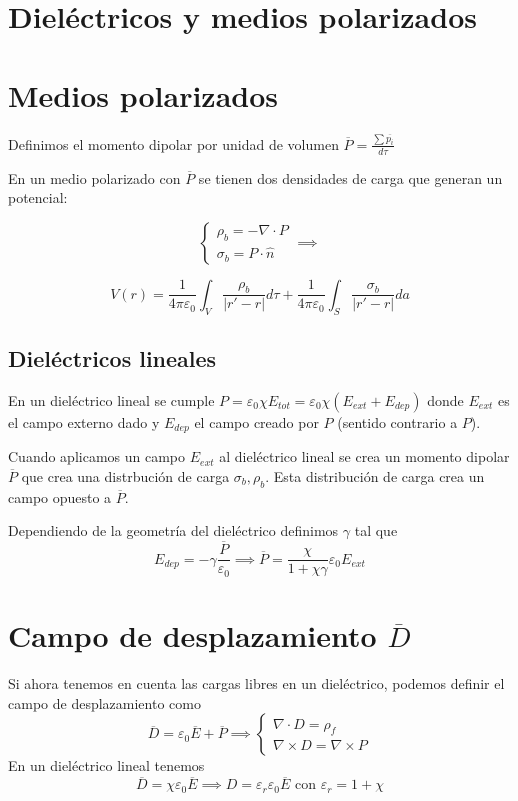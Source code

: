 \documentclass{myclass}
\begin{document}
\section{Dieléctricos y medios polarizados}
\section{Medios polarizados}
Definimos el momento dipolar por unidad de volumen $\boxed{\overline{P} = \frac{\sum \overline{p_i}}{d\tau}}$

En un medio polarizado con $\overline{P}$ se tienen dos densidades de carga que generan un potencial:

\begin{minipage}{0.4\textwidth}
\[
\begin{cases}
  \rho _b = -\nabla\cdot P\\
  \sigma _b = P\cdot \hat{n}
\end{cases}
\implies
\] 
\end{minipage}
\begin{minipage}{0.6\textwidth}
\[
V(r)=\frac{1}{4\pi\varepsilon _0}\int_V \frac{\rho _b}{ |r'-r|}d\tau + \frac{1}{4\pi\varepsilon _0}\int_S \frac{\sigma _b}{|r'-r|}da
\] 
\end{minipage}

\subsection{Dieléctricos lineales}
En un dieléctrico lineal se cumple $P = \varepsilon_0 \chi E_{tot} = \varepsilon _0\chi (E_{ext}+E_{dep})$ donde $E_{ext}$ es el campo externo dado y $E_{dep}$ el campo creado por $P$ (sentido contrario a $P$).

Cuando aplicamos un campo $E_{ext}$ al dieléctrico lineal se crea un momento dipolar $\overline{P}$ que crea una distrbución de carga $\sigma _b, \rho _b$. Esta distribución de carga crea un campo opuesto a $\overline{P}$.

Dependiendo de la geometría del dieléctrico definimos $\gamma$ tal que 
\[
E_{dep} = -\gamma \frac{\overline{P}}{\varepsilon _0} \implies \boxed{\overline{P}=\frac{\chi }{1+\chi \gamma}\varepsilon _0E_{ext}}
\] 

\section{Campo de desplazamiento $\overline{D}$}
Si ahora tenemos en cuenta las cargas libres en un dieléctrico, podemos definir el campo de desplazamiento como
\[
\boxed{\overline{D} = \varepsilon _0 \overline{E} + \overline{P}} \implies \begin{cases}
  \nabla\cdot D = \rho _f \\
  \nabla\times D = \nabla\times P
\end{cases}
\] 
En un dieléctrico lineal tenemos
\[
\overline{D} = \chi \varepsilon _0 \overline{E} \implies \boxed{D = \varepsilon _r\varepsilon _0\overline{E}} \text{ con } \varepsilon _r = 1+\chi 
\] 
\end{document}
